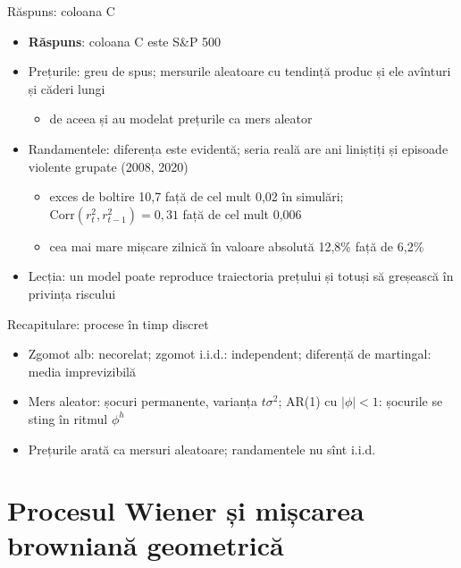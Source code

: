 \begin{frame}{Răspuns: coloana C}
\itemsize{\small}
\begin{itemize}
    \item \textbf{Răspuns}: coloana C este S\&P 500
    \item Prețurile: greu de spus; mersurile aleatoare cu tendință produc și ele avînturi și căderi lungi
    \begin{itemize}
        \item de aceea  și  au modelat prețurile ca mers aleator
    \end{itemize}
    \item Randamentele: diferența este evidentă; seria reală are ani liniștiți și episoade violente grupate (2008, 2020)
    \begin{itemize}
        \item exces de boltire 10{,}7 față de cel mult 0{,}02 în simulări; $\text{Corr}(r_t^2, r_{t-1}^2) = 0{,}31$ față de cel mult 0{,}006
        \item cea mai mare mișcare zilnică în valoare absolută 12{,}8\% față de 6{,}2\%
    \end{itemize}
    \item Lecția: un model poate reproduce traiectoria prețului și totuși să greșească în privința riscului
\end{itemize}
\end{frame}

\begin{frame}{Recapitulare: procese în timp discret}
\itemsize{\small}
\begin{itemize}
    \item Zgomot alb: necorelat; zgomot i.i.d.: independent; diferență de martingal: media imprevizibilă
    \item Mers aleator: șocuri permanente, varianța $t\sigma^2$; AR(1) cu $|\phi| < 1$: șocurile se sting în ritmul $\phi^h$
    \item Prețurile arată ca mersuri aleatoare; randamentele nu sînt i.i.d.
\end{itemize}
\end{frame}


\section{Procesul Wiener și mișcarea browniană geometrică}

